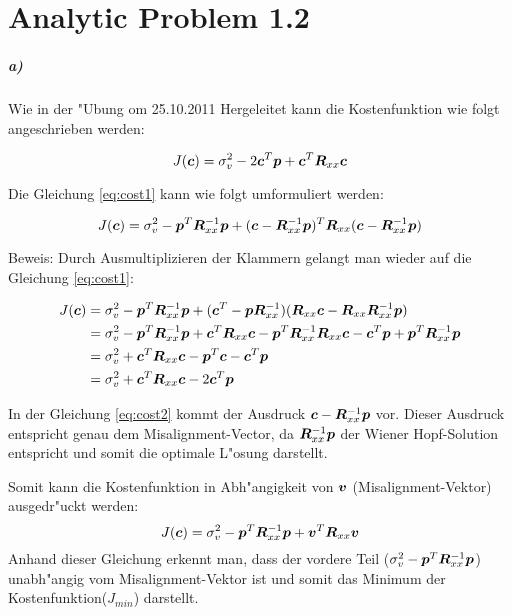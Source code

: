 \clearpage
\chapter{Analytic Problem 1.2}

\paragraph{a)}
Wie in der "Ubung om 25.10.2011 Hergeleitet kann die Kostenfunktion wie folgt angeschrieben werden:

\begin{equation}
 J(\bm{c}) = \sigma_v^2 - 2\bm{c}^T \bm{p} + \bm{c}^T\bm{R}_{xx}\bm{c}
\label{eq:cost1}
\end{equation}

Die Gleichung \ref{eq:cost1} kann wie folgt umformuliert werden:

\begin{equation}
 J(\bm{c}) = \sigma_v^2 - \bm{p}^T\bm{R}_{xx}^{-1}\bm{p} + (\bm{c} - \bm{R}_{xx}^{-1}\bm{p})^T\bm{R}_{xx}(\bm{c} - \bm{R}_{xx}^{-1}\bm{p})
\label{eq:cost2}
\end{equation}


Beweis: Durch Ausmultiplizieren der Klammern gelangt man wieder auf die Gleichung \ref{eq:cost1}:

\begin{align}
 J(\bm{c}) &= \sigma_v^2 - \bm{p}^T\bm{R}_{xx}^{-1}\bm{p} + (\bm{c}^T - \bm{p}\bm{R}_{xx}^{-1})(\bm{R}_{xx}\bm{c} - \bm{R}_{xx}\bm{R}_{xx}^{-1}\bm{p}) \\
  &=  \sigma_v^2 - \bm{p}^T\bm{R}_{xx}^{-1}\bm{p} + \bm{c}^T\bm{R}_{xx}\bm{c} - \bm{p}^T\bm{R}_{xx}^{-1}\bm{R}_{xx}\bm{c} - \bm{c}^T\bm{p} + \bm{p}^T\bm{R}_{xx}^{-1}\bm{p} \\
  &=  \sigma_v^2 + \bm{c}^T\bm{R}_{xx}\bm{c} - \bm{p}^T\bm{c} - \bm{c}^T\bm{p} \\
  &=  \sigma_v^2 + \bm{c}^T\bm{R}_{xx}\bm{c} - 2 \bm{c}^T\bm{p}
\label{eq:cost_beweis}
\end{align}

In der Gleichung \ref{eq:cost2} kommt der Ausdruck $\bm{c} - \bm{R}_{xx}^{-1}\bm{p}$ vor. Dieser Ausdruck entspricht
genau dem Misalignment-Vector, da $\bm{R}_{xx}^{-1}\bm{p}$ der Wiener Hopf-Solution entspricht und somit die optimale
L"osung darstellt.

Somit kann die Kostenfunktion in Abh"angigkeit von $\bm{v}$ (Misalignment-Vektor) ausgedr"uckt werden:
\begin{equation}
 J(\bm{c}) = \sigma_v^2 - \bm{p}^T\bm{R}_{xx}^{-1}\bm{p} + \bm{v}^T\bm{R}_{xx}\bm{v}
\label{eq:cost3}
\end{equation}
Anhand dieser Gleichung erkennt man, dass der vordere Teil ($\sigma_v^2 - \bm{p}^T\bm{R}_{xx}^{-1}\bm{p}$)
unabh"angig vom Misalignment-Vektor ist und somit das Minimum der Kostenfunktion($J_{min}$) darstellt.

